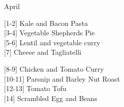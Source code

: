 		\begin{menu}{April}
    
    \begin{recipelist}
    
        {\scriptsize[1-2]} Kale and Bacon Pasta\\
        {\scriptsize[3-4]} Vegetable Shepherds Pie\\
        {\scriptsize[5-6]} Lentil and vegetable curry\\
        {\scriptsize[7]} Cheese and Tagliatelli\\%
    \end{recipelist}%
    \begin{recipelist}
    
        {\scriptsize[8-9]} Chicken and Tomato Curry\\
        {\scriptsize[10-11]} Parsnip and Barley Nut Roast\\
        {\scriptsize[12-13]} Tomato Tofu\\
        {\scriptsize[14]} Scrambled Egg and Beans\\%
    \end{recipelist}\par%
  

\end{menu}
